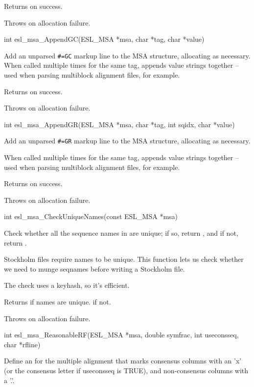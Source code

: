 \begin{sreapi}
Returns  on success.

Throws  on allocation failure.


\hypertarget{func:esl_msa_AppendGC()}
{\item[int esl\_msa\_AppendGC(ESL\_MSA *msa, char *tag, char *value)]}

Add an unparsed \verb+#=GC+ markup line to the MSA 
structure, allocating as necessary. When called 
multiple times for the same tag, appends value 
strings together -- used when parsing multiblock 
alignment files, for example.

Returns  on success.

Throws  on allocation failure.


\hypertarget{func:esl_msa_AppendGR()}
{\item[int esl\_msa\_AppendGR(ESL\_MSA *msa, char *tag, int sqidx, char *value)]}

Add an unparsed \verb+#=GR+ markup line to the MSA structure, 
allocating as necessary.

When called multiple times for the same tag, appends 
value strings together -- used when parsing multiblock 
alignment files, for example.

Returns  on success.

Throws  on allocation failure.


\hypertarget{func:esl_msa_CheckUniqueNames()}
{\item[int esl\_msa\_CheckUniqueNames(const ESL\_MSA *msa)]}

Check whether all the sequence names in 
are unique; if so, return , and if not,
return . 

Stockholm files require names to be unique.  This
function lets us check whether we need to munge seqnames
before writing a Stockholm file.

The check uses a keyhash, so it's efficient.

Returns  if names are unique.
 if not.

Throws  on allocation failure.


\hypertarget{func:esl_msa_ReasonableRF()}
{\item[int esl\_msa\_ReasonableRF(ESL\_MSA *msa, double symfrac, int useconsseq, char *rfline)]}

Define an  for the multiple alignment  that
marks consensus columns with an 'x' (or the consensus
letter if useconsseq is TRUE), and non-consensus columns
with a '.'.


\end{sreapi}
